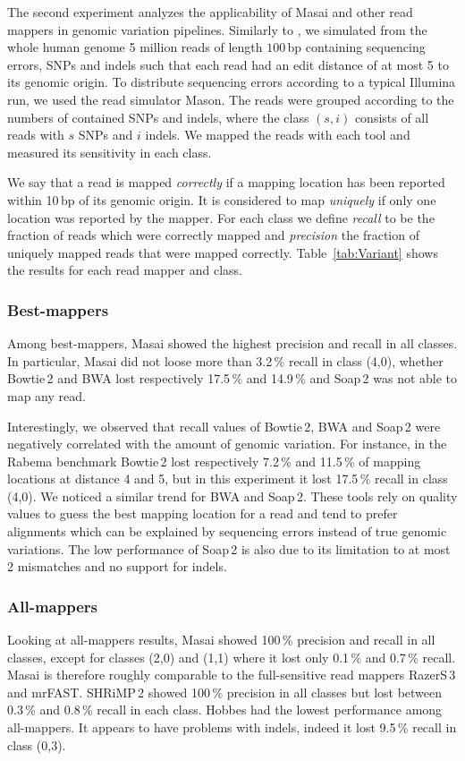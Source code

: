 The second experiment analyzes the applicability of Masai and other read mappers in genomic variation pipelines.
Similarly to \citep{Shrimp2}, we simulated from the whole human genome 5 million reads of length $100$\,bp containing sequencing errors, SNPs and indels such that each read had an edit distance of at most 5 to its genomic origin.
To distribute sequencing errors according to a typical Illumina run, we used the read simulator Mason.
The reads were grouped according to the numbers of contained SNPs and indels, where the class $(s,i)$ consists of all reads with $s$ SNPs and $i$ indels.
We mapped the reads with each tool and measured its sensitivity in each class.

We say that a read is mapped \emph{correctly} if a mapping location has been reported within 10\,bp of its genomic origin.
It is considered to map \emph{uniquely} if only one location was reported by the mapper.
For each class we define \emph{recall} to be the fraction of reads which were correctly mapped and \emph{precision} the fraction of uniquely mapped reads that were mapped correctly.
Table~\ref{tab:Variant} shows the results for each read mapper and class.

\subsubsection{Best-mappers}
Among best-mappers, Masai showed the highest precision and recall in all classes.
In particular, Masai did not loose more than 3.2\,\% recall in class (4,0), whether Bowtie\,2 and BWA lost respectively 17.5\,\% and 14.9\,\% and Soap\,2 was not able to map any read.

Interestingly, we observed that recall values of Bowtie\,2, BWA and Soap\,2 were negatively correlated with the amount of genomic variation.
For instance, in the Rabema benchmark Bowtie\,2 lost respectively 7.2\,\% and 11.5\,\% of mapping locations at distance 4 and 5, but in this experiment it lost 17.5\,\% recall in class (4,0).
We noticed a similar trend for BWA and Soap\,2.
These tools rely on quality values to guess the best mapping location for a read and tend to prefer alignments which can be explained by sequencing errors instead of true genomic variations.
The low performance of Soap\,2 is also due to its limitation to at most 2 mismatches and no support for indels.

\subsubsection{All-mappers}
Looking at all-mappers results, Masai showed 100\,\% precision and recall in all classes, except for classes (2,0) and (1,1) where it lost only 0.1\,\% and 0.7\,\% recall.
Masai is therefore roughly comparable to the full-sensitive read mappers RazerS\,3 and mrFAST.
SHRiMP\,2 showed 100\,\% precision in all classes but lost between 0.3\,\% and 0.8\,\% recall in each class.
Hobbes had the lowest performance among all-mappers.
It appears to have problems with indels, indeed it lost 9.5\,\% recall in class (0,3).

